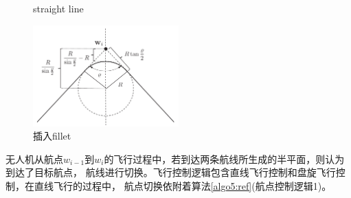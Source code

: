     \begin{figure}[b]
        \centering
        \caption{straight line}
    \end{figure}
    \begin{figure}[h]
        \centering
        \includegraphics[width=0.5\textwidth]{pictures/algo6_2.png}
        \caption{插入fillet}
        \label{figure:alg6}
    \end{figure}
    \par 无人机从航点$w_{i-1}$到$w_{i}$的飞行过程中，若到达两条航线所生成的半平面，则认为到达了目标航点，
    航线进行切换。飞行控制逻辑包含直线飞行控制和盘旋飞行控制，在直线飞行的过程中，
    航点切换依附着算法\ref{algo5:ref}(航点控制逻辑1)。
    
